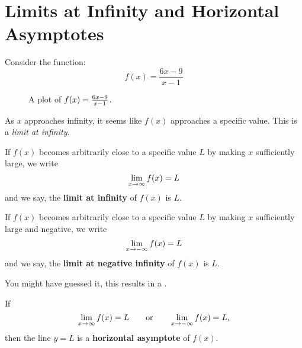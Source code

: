 \clearpage
\section{Limits at Infinity and Horizontal Asymptotes}

Consider the function:
$$
f(x) = \frac{6x-9}{x-1}
$$
\begin{figure}[H]
    \centering
    \caption{A plot of $f(x)=\protect\frac{6x-9}{x-1}$. \cite{mooc}}
    \label{plot:(6x-9)/(x-1)}
\end{figure}

As $x$ approaches infinity, it seems like $f(x)$ approaches a specific
value. This is a \textit{limit at infinity}. \cite{mooc}

\begin{definition}\label{def:limitAtInfty}
If $f(x)$ becomes arbitrarily close to a specific value $L$ by making
$x$ sufficiently large, we write
\[
\displaystyle\lim\limits_{x\to \infty} f(x) = L
\]
and we say, the \textbf{limit at infinity} of $f(x)$ is $L$.  

If $f(x)$ becomes
arbitrarily close to a specific value $L$ by making $x$ sufficiently
large and negative, we write
\[
\displaystyle\lim\limits_{x\to -\infty} f(x) = L
\]
and we say, the \textbf{limit at negative infinity} of $f(x)$ is $L$.  
\\\cite{mooc}
\end{definition}

You might have guessed it, this results in a .

\begin{definition}\label{def:horiz asymptote}
    If  
    \[
    \displaystyle\lim\limits_{x\to \infty} f(x) = L \qquad\text{or}\qquad \displaystyle\lim\limits_{x\to -\infty} f(x) = L,
    \]
    then the line $y=L$ is a \textbf{horizontal asymptote} of $f(x)$.
    \\\cite{mooc}
\end{definition}

